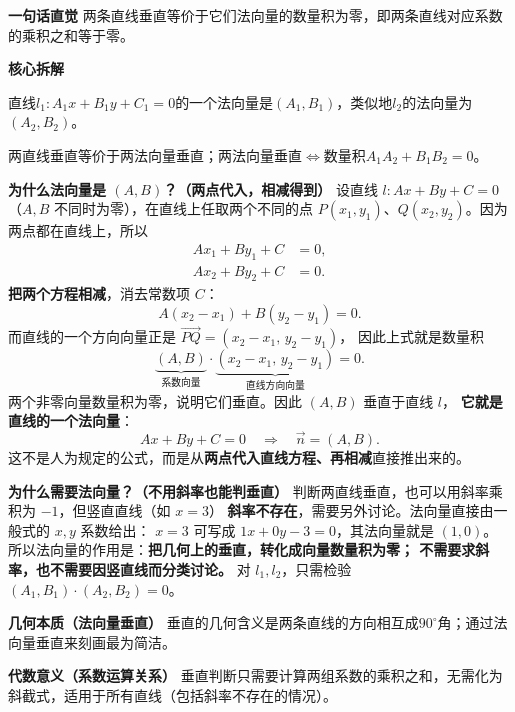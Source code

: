 \begin{explanationbox}
	\textbf{\textcolor{CExplanation}{一句话直觉}}
	两条直线垂直等价于它们法向量的数量积为零，即两条直线对应系数的乘积之和等于零。

	\medskip
	\textbf{\textcolor{CExplanation}{核心拆解}}
	\begin{description}[style=nextline, leftmargin=2.8em, labelsep=0.5em, itemsep=0.45em]
		\item[\textbf{要点一（法向量引入）：}]
			直线$l_1:A_1x+B_1y+C_1=0$的一个法向量是$(A_1,B_1)$，类似地$l_2$的法向量为$(A_2,B_2)$。
		\item[\textbf{要点二（垂直对应点积零）：}]
			两直线垂直等价于两法向量垂直；两法向量垂直$\Leftrightarrow$数量积$A_1A_2+B_1B_2=0$。
	\end{description}


	\medskip
	\textbf{\textcolor{CExplanation}{为什么法向量是 $(A,B)$？（两点代入，相减得到）}}
	设直线 $l:Ax+By+C=0$（$A,B$ 不同时为零），在直线上任取两个不同的点
	$P(x_1,y_1)$、$Q(x_2,y_2)$。因为两点都在直线上，所以
	\[
	\begin{aligned}
	Ax_1+By_1+C&=0,\\
	Ax_2+By_2+C&=0.
	\end{aligned}
	\]
	\textbf{把两个方程相减}，消去常数项 $C$：
	\[
	A(x_2-x_1)+B(y_2-y_1)=0.
	\]
	而直线的一个方向向量正是 $\overrightarrow{PQ}=(x_2-x_1,\,y_2-y_1)$，
	因此上式就是数量积
	\[
	\underbrace{(A,B)}_{\text{系数向量}}\cdot
	\underbrace{(x_2-x_1,\,y_2-y_1)}_{\text{直线方向向量}}=0.
	\]
	两个非零向量数量积为零，说明它们垂直。因此 $(A,B)$ 垂直于直线 $l$，
	\textbf{它就是直线的一个法向量}：
	\[
	\boxed{Ax+By+C=0\quad\Longrightarrow\quad\vec n=(A,B).}
	\]
	这不是人为规定的公式，而是从\textbf{两点代入直线方程、再相减}直接推出来的。

	\medskip
	\textbf{\textcolor{CExplanation}{为什么需要法向量？（不用斜率也能判垂直）}}
	判断两直线垂直，也可以用斜率乘积为 $-1$，但竖直直线（如 $x=3$）
	\textbf{斜率不存在}，需要另外讨论。法向量直接由一般式的 $x,y$ 系数给出：
	$x=3$ 可写成 $1x+0y-3=0$，其法向量就是 $(1,0)$。
	所以法向量的作用是：\textbf{把几何上的垂直，转化成向量数量积为零；
	不需要求斜率，也不需要因竖直线而分类讨论。}
	对 $l_1,l_2$，只需检验 $(A_1,B_1)\cdot(A_2,B_2)=0$。

	\medskip
	\textbf{\textcolor{CExplanation}{几何本质（法向量垂直）}}
	垂直的几何含义是两条直线的方向相互成$90^\circ$角；通过法向量垂直来刻画最为简洁。

	\medskip
	\textbf{\textcolor{CExplanation}{代数意义（系数运算关系）}}
	垂直判断只需要计算两组系数的乘积之和，无需化为斜截式，适用于所有直线（包括斜率不存在的情况）。


\end{explanationbox}
